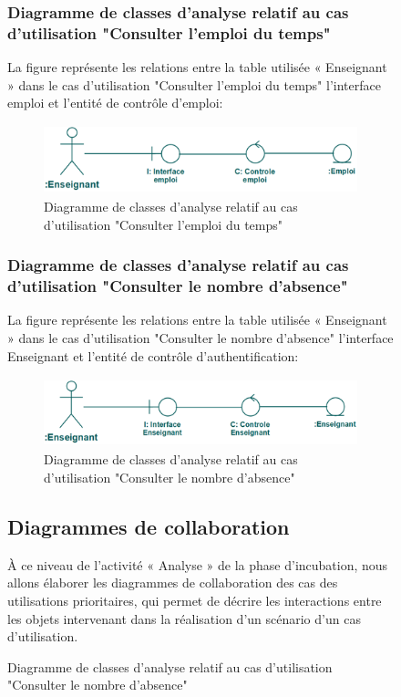 \documentclass[12 pt]{report}
\begin{document}
\begin{figure}[h]
\begin{center}
\subsubsection{Diagramme de classes d’analyse relatif au cas d’utilisation  "Consulter l'emploi du temps" }
La figure  représente les relations entre la table utilisée « Enseignant » dans le cas d’utilisation "Consulter l'emploi du temps" l’interface  emploi et  l'entité de  contrôle d'emploi:
\begin{figure}[h]
\begin{center}
\includegraphics[width= 12cm , height =2cm]{tet.png}
\caption{Diagramme de classes d’analyse relatif au cas d’utilisation "Consulter l'emploi du temps"}
\end{center}
\end{figure}
\subsubsection{Diagramme de classes d’analyse relatif au cas d’utilisation  "Consulter le nombre d'absence" }
La figure  représente les relations entre la table utilisée « Enseignant » dans le cas d’utilisation "Consulter le nombre d'absence" l’interface  Enseignant et  l'entité de  contrôle d'authentification:
\begin{figure}[h]
\begin{center}
\includegraphics[width= 12cm , height =2cm]{ccna.png}
\caption{Diagramme de classes d’analyse relatif au cas d’utilisation "Consulter le nombre d'absence"}
\end{center}
\end{figure}
\subsection{Diagrammes de collaboration }
 À ce niveau de l’activité « Analyse » de la phase d’incubation, nous allons élaborer les diagrammes de collaboration des cas des utilisations prioritaires, qui permet de décrire les interactions entre les
objets intervenant dans la réalisation d’un scénario d’un cas d’utilisation.

\end{center}
\end{figure}
\end{document}
